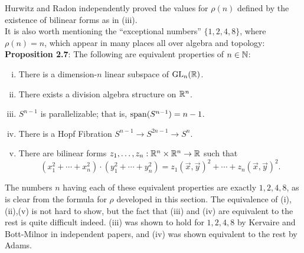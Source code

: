 \documentclass{amsart}
\begin{document}
Hurwitz and Radon independently proved the values for $\rho(n)$ defined by the existence of bilinear forms as in (iii).\\

It is also worth mentioning the  ``exceptional numbers'' $\{1,2,4,8\}$, where $\rho(n)=n$, which appear in many places all over algebra and topology:\\

\noindent \textbf{Proposition 2.7}: The following are equivalent properties of $n\in \mathbb{N}$:
\begin{enumerate}[(i)]
	\item There is a dimension-$n$ linear subspace of $\operatorname{GL}_n(\mathbb{R})$.
	\item There exists a division algebra structure on $\mathbb{R}^n$.
	\item $S^{n-1}$ is parallelizable; that is, $\operatorname{span}(S^{n-1})=n-1$.
	\item There is a Hopf Fibration $S^{n-1}\to S^{2n-1}\to S^n$.
	\item There are bilinear forms $z_1,\dots,z_n:\mathbb{R}^n\times \mathbb{R}^n \to \mathbb{R}$ such that
	$$
	(x_1^2+\cdots + x_n^2) \cdot (y_1^2+\cdots +y_n^2) = z_1(\vec{x},\vec{y})^2 + \cdots + z_n(\vec{x},\vec{y})^2.
	$$
\end{enumerate}
\vspace{5mm}

The numbers $n$ having each of these equivalent properties are exactly $1,2,4,8$, as is clear from the formula for $\rho$ developed in this section. The equivalence of (i),(ii),(v) is not hard to show, but the fact that (iii) and (iv) are equivalent to the rest is quite difficult indeed. (iii) was shown to hold for $1,2,4,8$ by Kervaire and Bott-Milnor in independent papers, and (iv) was shown equivalent to the rest by Adams.
	

\printbibliography
\end{document}
